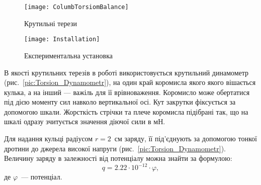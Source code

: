 \begin{figure}[ht!]\centering
	\begin{minipage}[t]{0.45\linewidth}\centering
			\texttt{[image: ColumbTorsiomBalance]}
			\caption{Крутильні терези}
			\label{pic:ColumbTorsiomBalance}
	\end{minipage}
	\quad%
	\begin{minipage}[t]{0.45\linewidth}\centering
			\texttt{[image: Installation]}
			\caption{Експериментальна установка}
			\label{pic:Installation}
	\end{minipage}
\end{figure}

В якості крутильних терезів в роботі використовується крутильний динамометр (рис.~\ref{pic:Torsion_Dynamometr}), на один край коромисла якого якого вішається кулька, а на інший --- важіль для її врівноваження. Коромисло може обертатися під дією моменту сил навколо вертикальної осі. Кут закрутки фіксується за допомогою шкали. Жорсткість стрічки та плече коромисла підібрані так, що на шкалі одразу зчитується значення діючої сили в мН.

Для надання кульці радіусом $r = 2$~см заряду, її під'єднують за допомогою тонкої дротини до джерела високої напруги (рис.~\ref{pic:Torsion_Dynamometr}). Величину заряду в залежності від потенціалу можна знайти за формулою:
\begin{equation}\label{qU}
    q = 2.22 \cdot 10^{-12} \cdot \varphi,
\end{equation}
де $\varphi$~--- потенціал.

